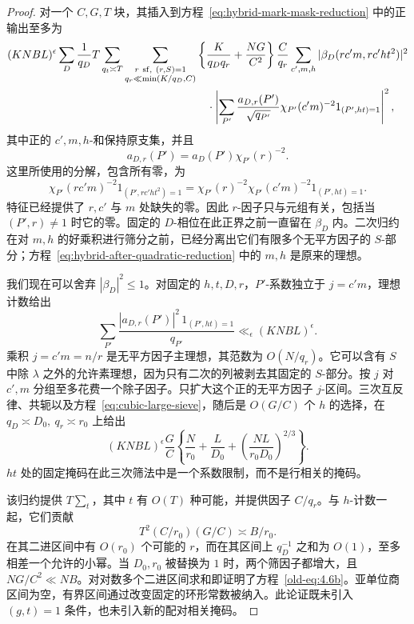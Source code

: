 \begin{proof}
对一个 \(C,G,T\) 块，其插入到方程~\eqref{eq:hybrid-mark-mask-reduction} 中的正输出至多为
\begin{equation}\label{eq:hybrid-after-quadratic-reduction}
 \begin{split}
 (KNBL)^\epsilon\sum_D\frac1{q_D}T\sum_{q_t\asymp T}
 \sum_{\substack{r\ {\rm sf},\ (r,S)=1\\q_r\ll\min(K/q_D,C)}}
 &\left\{\frac K{q_Dq_r}+\frac{NG}{C^2}\right\}\frac C{q_r}
 \sum_{c',m,h}|\beta_D(rc'm,rc'ht^2)|^2\\
 &\quad\cdot\left|
 \sum_{P'}\frac{a_{D,r}(P')}{\sqrt{q_{P'}}}
       \chi_{P'}(c'm)^{-2}1_{(P',ht)=1}
 \right|^2,
 \end{split}
\end{equation}
其中正的 \(c',m,h\)-和保持原支集，并且
\[
 a_{D,r}(P')=a_D(P')\chi_{P'}(r)^{-2}.
\]
这里所使用的分解，包含所有零，为
\[
 \chi_{P'}(rc'm)^{-2}1_{(P',rc'ht^2)=1}
 =\chi_{P'}(r)^{-2}\chi_{P'}(c'm)^{-2}1_{(P',ht)=1}.
\]
特征已经提供了 \(r,c'\) 与 \(m\) 处缺失的零。因此 \(r\)-因子只与元组有关，包括当 \((P',r)\ne1\) 时它的零。固定的 \(D\)-相位在此正界之前一直留在 \(\beta_D\) 内。二次归约在对 \(m,h\) 的好乘积进行筛分之前，已经分离出它们有限多个无平方因子的 \(S\)-部分；方程~\eqref{eq:hybrid-after-quadratic-reduction} 中的 \(m,h\) 是原来的理想。

我们现在可以舍弃 \(|\beta_D|^2\le1\)。对固定的 \(h,t,D,r\)，\(P'\)-系数独立于 \(j=c'm\)，理想计数给出
\[
 \sum_{P'}\frac{|a_{D,r}(P')|^2\,1_{(P',ht)=1}}{q_{P'}}
 \ll_\epsilon (KNBL)^\epsilon.
\]
乘积 \(j=c'm=n/r\) 是无平方因子主理想，其范数为 \(O(N/q_r)\)。它可以含有 \(S\) 中除 \(\lambda\) 之外的允许素理想，因为只有二次的列被剥去其固定的 \(S\)-部分。按 \(j\) 对 \(c',m\) 分组至多花费一个除子因子。只扩大这个正的无平方因子 \(j\)-区间。三次互反律、共轭以及方程~\eqref{eq:cubic-large-sieve}，随后是 \(O(G/C)\) 个 \(h\) 的选择，在 \(q_D\asymp D_0,\ q_r\asymp r_0\) 上给出
\begin{equation}\label{old-eq:4.6c}
 (KNBL)^\epsilon\frac GC
 \left\{\frac N{r_0}+\frac L{D_0}
       +\left(\frac{NL}{r_0D_0}\right)^{2/3}\right\}.
\end{equation}
\(ht\) 处的固定掩码在此三次筛法中是一个系数限制，而不是行相关的掩码。

该归约提供 \(T\sum_t\)，其中 \(t\) 有 \(O(T)\) 种可能，并提供因子 \(C/q_r\)。与 \(h\)-计数一起，它们贡献
\[
 T^2(C/r_0)(G/C)\asymp B/r_0.
\]
在其二进区间中有 \(O(r_0)\) 个可能的 \(r\)，而在其区间上 \(q_D^{-1}\) 之和为 \(O(1)\)，至多相差一个允许的小幂。当 \(D_0,r_0\) 被替换为 \(1\) 时，两个筛因子都增大，且 \(NG/C^2\ll NB\)。对对数多个二进区间求和即证明了方程~\eqref{old-eq:4.6b}。亚单位商区间为空，有界区间通过改变固定的环形常数被纳入。此论证既未引入 \((g,t)=1\) 条件，也未引入新的配对相关掩码。
\end{proof}

